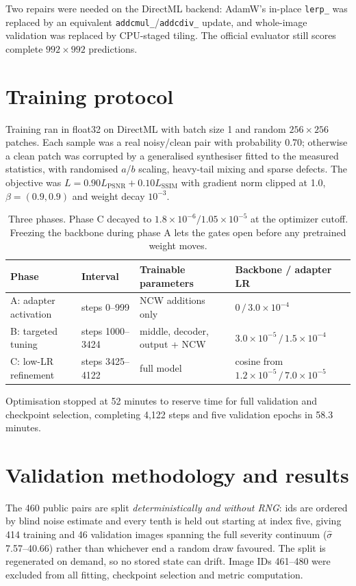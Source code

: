 \documentclass[12pt,a4paper]{article}
\begin{document}
Two repairs were needed on the DirectML backend: AdamW's in-place \texttt{lerp\_} was replaced by an equivalent \texttt{addcmul\_}/\texttt{addcdiv\_} update, and whole-image validation was replaced by CPU-staged tiling. The official evaluator still scores complete $992\times992$ predictions.

\section{Training protocol}
Training ran in float32 on DirectML with batch size 1 and random $256\times256$ patches. Each sample was a real noisy/clean pair with probability 0.70; otherwise a clean patch was corrupted by a generalised synthesiser fitted to the measured statistics, with randomised $a$/$b$ scaling, heavy-tail mixing and sparse defects. The objective was $L=0.90L_{\mathrm{PSNR}}+0.10L_{\mathrm{SSIM}}$ with gradient norm clipped at 1.0, $\beta=(0.9,0.9)$ and weight decay $10^{-3}$.

\begin{table}[h]
\centering\small
\begin{tabularx}{\textwidth}{@{}>{\raggedright\arraybackslash}p{}>{\raggedright\arraybackslash}p{}>{\raggedright\arraybackslash}X>{\raggedright\arraybackslash}p{}@{}}
\toprule
Phase & Interval & Trainable parameters & Backbone / adapter LR \\
\midrule
A: adapter activation & steps 0--999 & NCW additions only & $0\,/\,3.0\times10^{-4}$ \\
B: targeted tuning & steps 1000--3424 & middle, decoder, output + NCW & $3.0\times10^{-5}\,/\,1.5\times10^{-4}$ \\
C: low-LR refinement & steps 3425--4122 & full model & cosine from $1.2\times10^{-5}\,/\,7.0\times10^{-5}$ \\
\bottomrule
\end{tabularx}
\caption{Three phases. Phase C decayed to $1.8\times10^{-6}/1.05\times10^{-5}$ at the optimizer cutoff. Freezing the backbone during phase A lets the gates open before any pretrained weight moves.}
\end{table}

Optimisation stopped at 52 minutes to reserve time for full validation and checkpoint selection, completing 4{,}122 steps and five validation epochs in 58.3 minutes.

\section{Validation methodology and results}
The 460 public pairs are split \emph{deterministically and without RNG}: ids are ordered by blind noise estimate and every tenth is held out starting at index five, giving 414 training and 46 validation images spanning the full severity continuum ($\hat\sigma$ 7.57--40.66) rather than whichever end a random draw favoured. The split is regenerated on demand, so no stored state can drift. Image IDs 461--480 were excluded from all fitting, checkpoint selection and metric computation.
\end{document}

